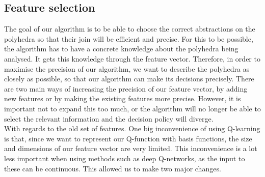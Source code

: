 \subsection{Feature selection}
The goal of our algorithm is to be able to choose the correct abstractions on the polyhedra so that their join will be efficient and precise. For this to be possible, the algorithm has to have a concrete knowledge about the polyhedra being analysed. It gets this knowledge through the feature vector. Therefore, in order to maximise the precision of our algorithm, we want to describe the polyhedra as closely as possible, so that our algorithm can make its decisions precisely. There are two main ways of increasing the precision of our feature vector, by adding new features or by making the existing features more precise. However, it is important not to expand this too much, or the algorithm will no longer be able to select the relevant information and the decision policy will diverge.\\
With regards to the old set of features. One big inconvenience of using Q-learning is that, since we want to represent our Q-function with basis functions, the size and dimensions of our feature vector are very limited. This inconvenience is a lot less important when using methods such as deep Q-networks, as the input to these can be continuous. This allowed us to make two major changes. 
